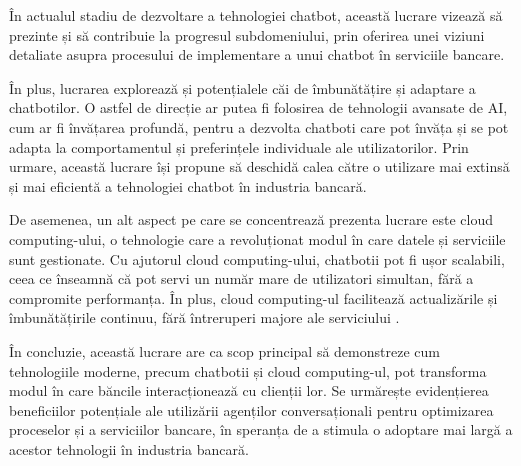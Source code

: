 În actualul stadiu de dezvoltare a tehnologiei chatbot, această lucrare vizează să prezinte și să contribuie la progresul subdomeniului, prin oferirea unei viziuni detaliate asupra procesului de implementare a unui chatbot în serviciile bancare.

În plus, lucrarea explorează și potențialele căi de îmbunătățire și adaptare a chatbotilor. O astfel de direcție ar putea fi folosirea de tehnologii avansate de AI, cum ar fi învățarea profundă, pentru a dezvolta chatboti care pot învăța și se pot adapta la comportamentul și preferințele individuale ale utilizatorilor. Prin urmare, această lucrare își propune să deschidă calea către o utilizare mai extinsă și mai eficientă a tehnologiei chatbot în industria bancară.

De asemenea, un alt aspect pe care se concentrează prezenta lucrare este cloud computing-ului, o tehnologie care a revoluționat modul în care datele și serviciile sunt gestionate. Cu ajutorul cloud computing-ului, chatbotii pot fi ușor scalabili, ceea ce înseamnă că pot servi un număr mare de utilizatori simultan, fără a compromite performanța. În plus, cloud computing-ul facilitează actualizările și îmbunătățirile continuu, fără întreruperi majore ale serviciului \cite{mell_grance2011}.

În concluzie, această lucrare are ca scop principal să demonstreze cum tehnologiile moderne, precum chatbotii și cloud computing-ul, pot transforma modul în care băncile interacționează cu clienții lor. Se urmărește evidențierea beneficiilor potențiale ale utilizării agenților conversaționali pentru optimizarea proceselor și a serviciilor bancare, în speranța de a stimula o adoptare mai largă a acestor tehnologii în industria bancară.